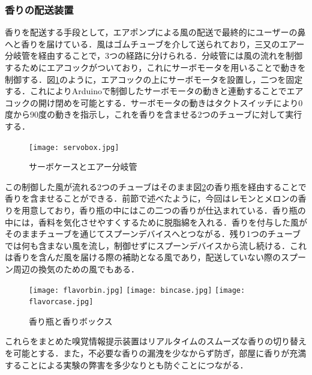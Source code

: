 \subsubsection{香りの配送装置}
香りを配送する手段として，エアポンプによる風の配送で最終的にユーザーの鼻へと香りを届けている．風はゴムチューブを介して送られており，三又のエアー分岐管を経由することで，3つの経路に分けられる．分岐管には風の流れを制御するためにエアコックがついており，これにサーボモータを用いることで動きを制御する．図\ref{servo}のように，エアコックの上にサーボモータを設置し，二つを固定する．これによりArduinoで制御したサーボモータの動きと連動することでエアコックの開け閉めを可能とする．サーボモータの動きはタクトスイッチにより0度から90度の動きを指示し，これを香りを含ませる2つのチューブに対して実行する．
\begin{figure}[t]
  \texttt{[image: servobox.jpg]}
  \caption{サーボケースとエアー分岐管}
  \label{servo}
\end{figure}
この制御した風が流れる2つのチューブはそのまま図\ref{flavor}の香り瓶を経由することで香りを含ませることができる．前節で述べたように，今回はレモンとメロンの香りを用意しており，香り瓶の中にはこの二つの香りが仕込まれている．香り瓶の中には，香料を気化させやすくするために脱脂綿を入れる．香りを付与した風がそのままチューブを通じてスプーンデバイスへとつながる．残り1つのチューブでは何も含まない風を流し，制御せずにスプーンデバイスから流し続ける．これは香りを含んだ風を届ける際の補助となる風であり，配送していない際のスプーン周辺の換気のための風でもある．


\begin{figure}[t]
  \texttt{[image: flavorbin.jpg]}
  \texttt{[image: bincase.jpg]}
  \texttt{[image: flavorcase.jpg]}
  \caption{香り瓶と香りボックス}
  \label{flavor}
\end{figure}


これらをまとめた嗅覚情報提示装置はリアルタイムのスムーズな香りの切り替えを可能とする．また，不必要な香りの漏洩を少なからず防ぎ，部屋に香りが充満することによる実験の弊害を多少なりとも防ぐことにつながる．
